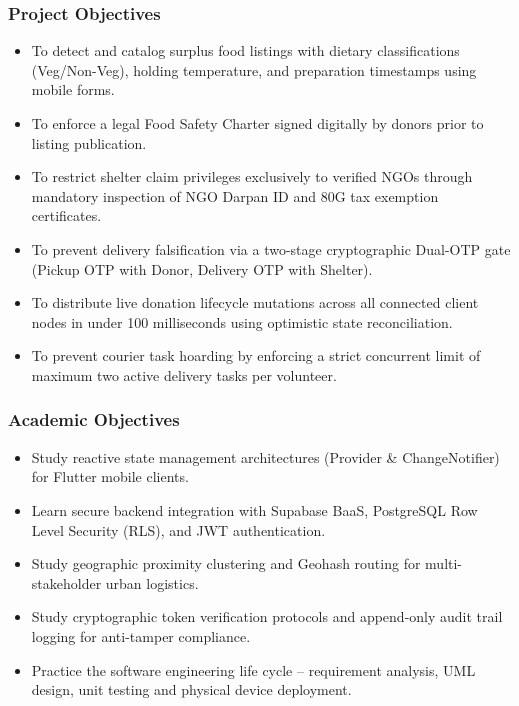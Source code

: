 \documentclass[12pt,a4paper]{article}
\begin{document}
\subsubsection{Project Objectives}
\begin{itemize}
    \item To detect and catalog surplus food listings with dietary classifications (Veg/Non-Veg), holding temperature, and preparation timestamps using mobile forms.
    \item To enforce a legal Food Safety Charter signed digitally by donors prior to listing publication.
    \item To restrict shelter claim privileges exclusively to verified NGOs through mandatory inspection of NGO Darpan ID and 80G tax exemption certificates.
    \item To prevent delivery falsification via a two-stage cryptographic Dual-OTP gate (Pickup OTP with Donor, Delivery OTP with Shelter).
    \item To distribute live donation lifecycle mutations across all connected client nodes in under 100 milliseconds using optimistic state reconciliation.
    \item To prevent courier task hoarding by enforcing a strict concurrent limit of maximum two active delivery tasks per volunteer.
\end{itemize}

\subsubsection{Academic Objectives}
\begin{itemize}
    \item Study reactive state management architectures (Provider \& ChangeNotifier) for Flutter mobile clients.
    \item Learn secure backend integration with Supabase BaaS, PostgreSQL Row Level Security (RLS), and JWT authentication.
    \item Study geographic proximity clustering and Geohash routing for multi-stakeholder urban logistics.
    \item Study cryptographic token verification protocols and append-only audit trail logging for anti-tamper compliance.
    \item Practice the software engineering life cycle -- requirement analysis, UML design, unit testing and physical device deployment.
\end{itemize}

\newpage
\end{document}

